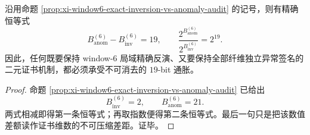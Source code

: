 \begin{corollary}\label{cor:xi-window6-nineteen-bit-inflation-rigidity}
沿用命题 \ref{prop:xi-window6-exact-inversion-vs-anomaly-audit} 的记号，则有精确恒等式
\[
\boxed{\;
B_{\mathrm{anom}}^{(6)}-B_{\mathrm{inv}}^{(6)}=19,\qquad
\frac{2^{B_{\mathrm{anom}}^{(6)}}}{2^{B_{\mathrm{inv}}^{(6)}}}=2^{19}.\;}
\]
因此，任何既要保持 window-\(6\) 局域精确反演、又要保持全部纤维独立异常签名的二元证书机制，都必须承受不可消去的 \(19\)-bit 通胀。
\end{corollary}
\begin{proof}
命题 \ref{prop:xi-window6-exact-inversion-vs-anomaly-audit} 已给出
\[
B_{\mathrm{inv}}^{(6)}=2,
\qquad
B_{\mathrm{anom}}^{(6)}=21.
\]
两式相减即得第一条恒等式；再取指数便得第二条恒等式。最后一句只是把该数值差额读作证书维数的不可压缩差距。证毕。
\end{proof}

\endinput
